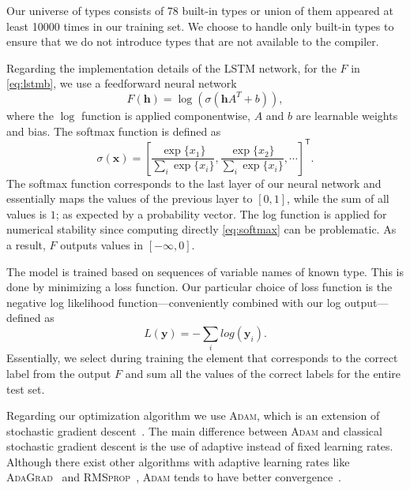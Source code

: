 \documentclass[sigplan,10pt,anonymous]{acmart} %
\theoremstyle{plain}
\theoremstyle{remark}
\theoremstyle{definition}
\begin{document}
Our universe of types consists of 78 built-in types or union of them appeared at least 10000 times in our training set.
We choose to handle only built-in types
to ensure that we do not introduce types that are not available to the compiler.

Regarding the implementation details of the LSTM network, for the $F$ in \eqref{eq:lstmb}, we use a
feedforward  neural network
\begin{equation}
  F(\bm{h}) = \log\left( \sigma\left(\bm{h}A^T + b \right) \right),\label{eq:feedforward}
\end{equation}
where the $\log$ function is applied componentwise, $A$ and $b$ are learnable weights and bias.
The softmax function is defined as
\begin{equation}\label{eq:softmax}
  \sigma(\bm{x}) = \left[\frac{\exp\{x_1\}}{\sum_i \exp\{x_i\}}, \frac{\exp\{x_2\}}{\sum_i \exp\{x_i\}}, \cdots \right]^\mathsf{T}.
\end{equation}
The softmax function corresponds to the last layer of our neural network and essentially maps the values of the previous layer to $[0, 1]$, while the sum of all values is $1$; as expected by a probability vector.
The log function is applied for numerical stability since computing directly \eqref{eq:softmax} can be problematic.
As a result, $F$ outputs values in $[-\infty, 0]$.

The model is trained based on sequences of variable names of known type.
This is done by minimizing a loss function.
Our particular choice of loss function is the negative log likelihood function---conveniently combined with our log output---defined as
\begin{equation}
  L(\bm{y}) = -\sum_i log(\bm{y}_i).
\end{equation}
Essentially, we select during training the element that corresponds to the correct label from the output $F$ and sum all the values of the correct labels for the entire test set.

Regarding our optimization algorithm we use \textsc{Adam}, which is an extension of stochastic gradient descent~\cite{kingma2014}.
The main difference between \textsc{Adam} and classical stochastic gradient descent is the use of adaptive instead of fixed learning rates.
Although there exist other algorithms with adaptive learning rates like \textsc{AdaGrad}~\cite{duchi2011} and \textsc{RMSprop}~\cite{tieleman2014}, \textsc{Adam} tends to have better convergence~\cite{ruder2016}.
\end{document}
